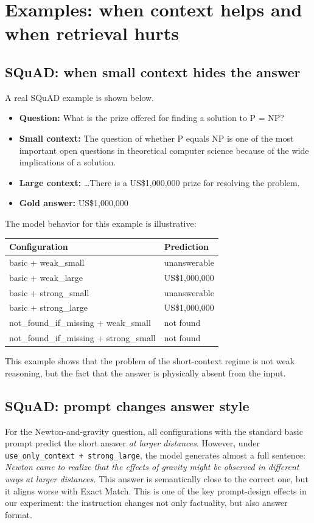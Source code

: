 \documentclass[a4paper,12pt]{article}
\begin{document}
\section{Examples: when context helps and when retrieval hurts}
\subsection{SQuAD: when small context hides the answer}
A real SQuAD example is shown below.
\begin{itemize}
    \item \textbf{Question:} What is the prize offered for finding a solution to P = NP?
    \item \textbf{Small context:} The question of whether P equals NP is one of the most important open questions in theoretical computer science because of the wide implications of a solution.
    \item \textbf{Large context:} \ldots There is a US\$1,000,000 prize for resolving the problem.
    \item \textbf{Gold answer:} US\$1,000,000
\end{itemize}
The model behavior for this example is illustrative:
\begin{center}
\begin{tabular}{|l|l|}
\hline
Configuration & Prediction \\
\hline
basic + weak\_small & unanswerable \\
basic + weak\_large & US\$1,000,000 \\
basic + strong\_small & unanswerable \\
basic + strong\_large & US\$1,000,000 \\
not\_found\_if\_missing + weak\_small & not found \\
not\_found\_if\_missing + strong\_small & not found \\
\hline
\end{tabular}
\end{center}
This example shows that the problem of the short-context regime is not weak reasoning, but the fact that the answer is physically absent from the input.

\subsection{SQuAD: prompt changes answer style}
For the Newton-and-gravity question, all configurations with the standard basic prompt predict the short answer \textit{at larger distances}. However, under \texttt{use\_only\_context + strong\_large}, the model generates almost a full sentence: \textit{Newton came to realize that the effects of gravity might be observed in different ways at larger distances.} This answer is semantically close to the correct one, but it aligns worse with Exact Match. This is one of the key prompt-design effects in our experiment: the instruction changes not only factuality, but also answer format.
\end{document}
